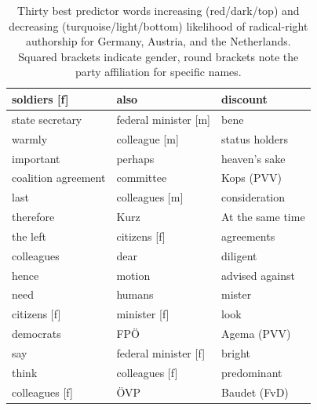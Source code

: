 \documentclass{article}
\begin{document}
\begin{table}[ht!]
\begin{tabular}{|l|l|l|}
\rowcolor[HTML]{c41200} 
\cellcolor[HTML]{00BFC4}soldiers {[}f{]} & also                        & discount                 \\ \hline
\rowcolor[HTML]{c41200} 
\cellcolor[HTML]{00BFC4}state secretary  & federal minister {[}m{]}            & bene                     \\ \hline
\rowcolor[HTML]{c41200} 
\cellcolor[HTML]{00BFC4}warmly           & colleague {[}m{]}           & status holders           \\ \hline
\rowcolor[HTML]{c41200} 
\cellcolor[HTML]{00BFC4}important        & perhaps                     & heaven’s sake            \\ \hline
\rowcolor[HTML]{00BFC4} 
coalition agreement                      & \cellcolor[HTML]{c41200}committee & Kops {(}PVV{)}           \\ \hline
\rowcolor[HTML]{00BFC4} 
last                                     & colleagues {[}m{]}          & consideration            \\ \hline
\rowcolor[HTML]{00BFC4} 
therefore                                & Kurz                        & At the same time         \\ \hline
\rowcolor[HTML]{00BFC4} 
the left                                 & citizens {[}f{]}            & agreements               \\ \hline
\rowcolor[HTML]{00BFC4} 
colleagues                               & dear                        & diligent                 \\ \hline
\rowcolor[HTML]{00BFC4} 
hence                                    & motion                      & advised against          \\ \hline
\rowcolor[HTML]{00BFC4} 
need                                     & humans                      & mister                   \\ \hline
\rowcolor[HTML]{00BFC4} 
citizens {[}f{]}                         & minister {[}f{]}            & look                     \\ \hline
\rowcolor[HTML]{00BFC4} 
democrats                                & FPÖ                         & Agema {(}PVV{)}          \\ \hline
\rowcolor[HTML]{00BFC4} 
say                                      & federal minister {[}f{]}                      & bright                   \\ \hline
\rowcolor[HTML]{00BFC4} 
think                                    & colleagues {[}f{]}          & predominant              \\ \hline
\rowcolor[HTML]{00BFC4} 
colleagues {[}f{]}                       & ÖVP                         & Baudet {(}FvD{)}         \\ \hline
\end{tabular}
\caption{Thirty best predictor words increasing (red/dark/top) and decreasing (turquoise/light/bottom) likelihood of radical-right authorship for Germany, Austria, and the Netherlands. Squared brackets indicate gender, round brackets note the party affiliation for specific names.}
\label{tab:bpws}
\end{table}
\end{document}
